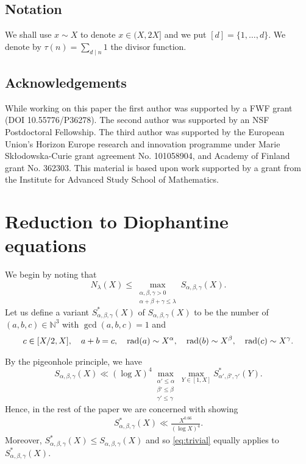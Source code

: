 \section*{Notation}
We shall use $x\sim X$ to denote $x\in (X,2X]$ and we put
$[d]=\{1,\dots,d\}$. We denote by $\tau(n)=\sum_{d\mid n}1$ the divisor function.

\section*{Acknowledgements}
While working on this paper
the first author was supported by
a FWF grant (DOI 10.55776/P36278).
The second author was supported by an NSF Postdoctoral Fellowship.
The third author was supported by the European Union's Horizon
Europe research and innovation programme under Marie Sk\l{}odowska-Curie grant agreement No. 101058904, and Academy of Finland grant No. 362303.
 This material is based upon work supported by a grant from the Institute
for Advanced Study School of Mathematics.



\chapter{Reduction to Diophantine equations}


We
 begin by noting that
\begin{equation}\label{eq:step1}
N_\lambda(X)\leq \max_{\substack{
\alpha,\beta,\gamma>0\\ \alpha+\beta+\gamma\leq \lambda}} S_{\alpha,\beta,\gamma}(X).
\end{equation}
Let us define a variant $S^*_{\alpha,\beta,\gamma}(X)$ of $S_{\alpha,\beta,\gamma}(X)$ to be the number of $(a,b,c)\in \mathbb{N}^3$ with $\gcd(a,b,c)=1$ and
\begin{align*}
c\in [X/2,X],\quad a+b=c,\quad \operatorname{rad}(a)\sim X^{\alpha},\quad \operatorname{rad}(b)\sim X^{\beta},\quad \operatorname{rad}(c)\sim X^{\gamma}.
\end{align*}

By the pigeonhole principle, we have
\begin{equation}\label{eq:S->S*}
S_{\alpha,\beta,\gamma}(X)\ll (\log X)^4\max_{\substack{\alpha'\leq \alpha\\\beta'\leq \beta\\\gamma'\leq \gamma}}\max_{Y\in [1,X]}S^*_{\alpha',\beta',\gamma'}(Y).
\end{equation}
Hence, in the rest of the paper we are concerned with showing
\begin{align}\label{eq:S*}
S^{*}_{\alpha,\beta,\gamma}(X)\ll \frac{X^{0.66}}{(\log X)^4}.
\end{align}
Moreover, $S^*_{\alpha,\beta,\gamma}(X)\leq S_{\alpha,\beta,\gamma}(X)$ and so
\eqref{eq:trivial} equally  applies to $S^*_{\alpha,\beta,\gamma}(X)$.


